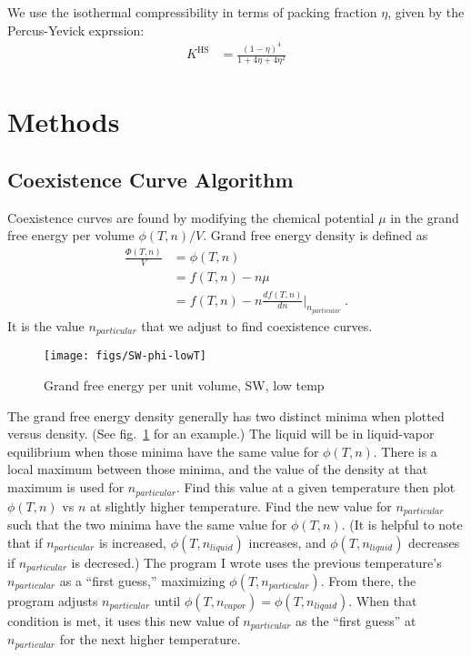 \documentclass[letterpaper,twocolumn,amsmath,amssymb,prb]{revtex4-1}
\newcommand{\npart}{\ensuremath{n_{particular}}}
\newcommand{\nliq}{\ensuremath{n_{liquid}}}
\newcommand{\nvap}{\ensuremath{n_{vapor}}}
\newcommand{\1}{\ensuremath{\textbf{r}_1}}
\newcommand{\2}{\ensuremath{\textbf{r}_2}}
\newcommand{\3}{\ensuremath{\textbf{r}_3}}
\newcommand{\4}{\ensuremath{\textbf{r}_4}}
\begin{document}
We use the isothermal compressibility in terms of packing fraction
$\eta$, given by the Percus-Yevick exprssion:\cite{Barker76}
\begin{align}
  K^\text{HS} &= \frac{\left(1 - \eta\right)^4}{1 + 4\eta + 4\eta^2}
\end{align}
\section{Methods}\label{sec:methods}

\subsection{Coexistence Curve Algorithm}\label{subsec:coexis}
Coexistence curves are found by modifying the chemical potential $\mu$
in the grand free energy per volume $\phi(T,n)/V$. Grand free energy
density is defined as
\begin{align}
  \frac{\Phi(T,n)}{V} &= \phi(T,n) \nonumber \\
                 &= f(T,n) - n\mu \nonumber \\
                 &= f(T,n) - n\frac{df(T,n)}{dn}\bigg|_{\npart}\ .
\end{align}
It is the value $\npart$ that we adjust to find coexistence curves.

\begin{figure}
  \centering
  \texttt{[image: figs/SW-phi-lowT]}
  \caption{Grand free energy per unit volume, SW, low temp}
  \label{fig:SW-phi-lowT}
\end{figure}

The grand free energy density generally has two distinct minima when
plotted versus density. (See fig.~\ref{fig:SW-phi-lowT} for an
example.) The liquid will be in liquid-vapor equilibrium when those
minima have the same value for $\phi(T,n)$. There is a local maximum
between those minima, and the value of the density at that maximum is
used for $\npart$. Find this value at a given temperature then plot
$\phi(T,n)$ vs $n$ at slightly higher temperature. Find the new value
for $\npart$ such that the two minima have the same value for
$\phi(T,n)$. (It is helpful to note that if $\npart$ is increased,
$\phi(T,\nliq)$ increases, and $\phi(T,\nliq)$ decreases if $\npart$
is decresed.) The program I wrote uses the previous temperature's
$\npart$ as a ``first guess,'' maximizing $\phi(T,\npart)$. From
there, the program adjusts $\npart$ until $\phi(T,\nvap) =
\phi(T,\nliq)$. When that condition is met, it uses this new value of
$\npart$ as the ``first guess'' at $\npart$ for the next higher
temperature.
\end{document}
